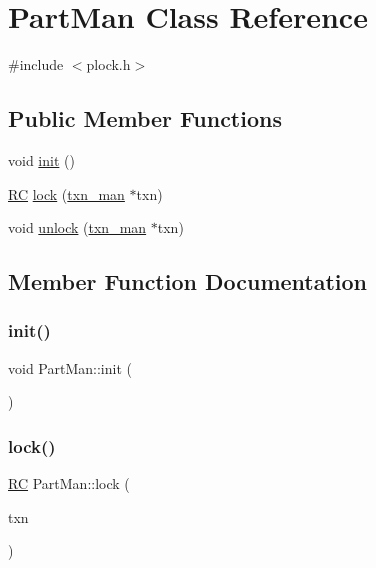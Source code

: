 \hypertarget{classPartMan}{}\section{Part\+Man Class Reference}
\label{classPartMan}


{\ttfamily \#include $<$plock.\+h$>$}

\subsection*{Public Member Functions}
\begin{DoxyCompactItemize}
\item 
void \hyperlink{classPartMan_a2109c7778dd588d9c9518bf9dda69c4e}{init} ()
\item 
\hyperlink{global_8h_a78c49a674c810fdd03d20432f7be864a}{RC} \hyperlink{classPartMan_aee08e519aa8582a69b7292726f068b06}{lock} (\hyperlink{classtxn__man}{txn\+\_\+man} $\ast$txn)
\item 
void \hyperlink{classPartMan_a226ba688ef0fb09259d174a3a46576a4}{unlock} (\hyperlink{classtxn__man}{txn\+\_\+man} $\ast$txn)
\end{DoxyCompactItemize}


\subsection{Member Function Documentation}
\mbox{\label{classPartMan_a2109c7778dd588d9c9518bf9dda69c4e}} 
\subsubsection{\texorpdfstring{init()}{init()}}
{\footnotesize\ttfamily void Part\+Man\+::init (\begin{DoxyParamCaption}{ }\end{DoxyParamCaption})}

\mbox{\label{classPartMan_aee08e519aa8582a69b7292726f068b06}} 
\subsubsection{\texorpdfstring{lock()}{lock()}}
{\footnotesize\ttfamily \hyperlink{global_8h_a78c49a674c810fdd03d20432f7be864a}{RC} Part\+Man\+::lock (\begin{DoxyParamCaption}\item[{\hyperlink{classtxn__man}{txn\+\_\+man} $\ast$}]{txn }\end{DoxyParamCaption})}

